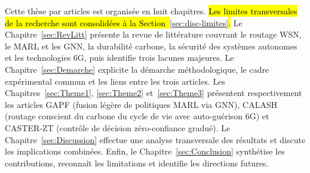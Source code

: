 Cette thèse par articles est organisée en huit chapitres. \hl{Les limites transversales de la recherche sont consolidées à la Section~}\ref{sec:disc-limites}\hl{.} Le Chapitre~\ref{sec:RevLitt} présente la revue de littérature couvrant le routage WSN, le MARL et les GNN, la durabilité carbone, la sécurité des systèmes autonomes et les technologies 6G, puis identifie trois lacunes majeures. Le Chapitre~\ref{sec:Demarche} explicite la démarche méthodologique, le cadre expérimental commun et les liens entre les trois articles. Les Chapitres~\ref{sec:Theme1}, \ref{sec:Theme2} et~\ref{sec:Theme3} présentent respectivement les articles GAPF (fusion légère de politiques MARL via GNN), CALASH (routage conscient du carbone du cycle de vie avec auto-guérison 6G) et CASTER-ZT (contrôle de décision zéro-confiance gradué). Le Chapitre~\ref{sec:Discussion} effectue une analyse transversale des résultats et discute les implications combinées. Enfin, le Chapitre~\ref{sec:Conclusion} synthétise les contributions, reconnaît les limitations et identifie les directions futures.
